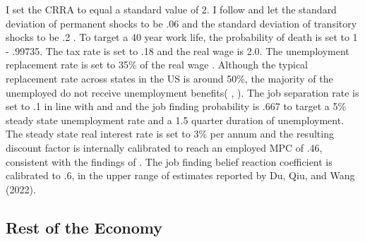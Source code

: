 \documentclass[titlepage]{\econtex}\providecommand{\texname}{Dissertation-Proposal}
\providecommand{\TableDir}{Tables}
\begin{document}
I set the CRRA to equal a standard value of 2. I follow \cite{carroll2017distribution} and let the standard deviation of permanent shocks to be .06 and the standard deviation of transitory shocks to be .2 . To target a 40 year work life, the probability of death is set to 1 - .99735. The tax rate is set to .18 and the real wage is 2.0.  The unemployment replacement rate is set to 35\% of the real wage . Although the typical replacement rate across states in the US is around 50\%,  the majority of the unemployed do not receive unemployment benefits( \cite{Graves2022}, \cite{CRLK2016}). The job separation rate is set to .1 in line with \cite{Graves2022} and \cite{Kekre2021} and the job finding probability is .667 to target a 5\% steady state unemployment rate and a 1.5 quarter duration of unemployment.  The steady state real interest rate is set to 3\% per annum and the resulting discount factor is internally calibrated to reach an employed MPC of .46, consistent with the findings of \cite{Kekre2021}. The job finding belief reaction coefficient is calibrated to .6, in the upper range of estimates reported by Du, Qiu, and Wang (2022).  \\




\hypertarget{Rest of the Economy }{}
\subsection{Rest of the Economy }
\end{document}
